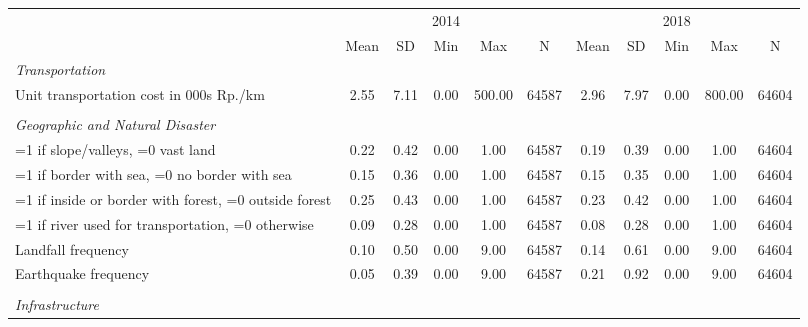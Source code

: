 \begin{tabular}{l*{2}{ccccc}}
\toprule
                &         &         &     2014&         &         &     &         &         2018&         &         \\
                &     Mean&       SD&      Min&      Max&        N&     Mean&       SD&      Min&      Max&        N\\
\midrule
\emph{Transportation}&         &         &         &         &         &         &         &         &         &         \\
\hspace{0.25cm}Unit transportation cost in 000s Rp./km&     2.55&     7.11&     0.00&   500.00&    64587&     2.96&     7.97&     0.00&   800.00&    64604\\
\vspace{0.1em} \\ \emph{Geographic and Natural Disaster}&         &         &         &         &         &         &         &         &         &         \\
\hspace{0.25cm}=1 if slope/valleys, =0 vast land&     0.22&     0.42&     0.00&     1.00&    64587&     0.19&     0.39&     0.00&     1.00&    64604\\
\hspace{0.25cm}=1 if border with sea, =0 no border with sea&     0.15&     0.36&     0.00&     1.00&    64587&     0.15&     0.35&     0.00&     1.00&    64604\\
\hspace{0.25cm}=1 if inside or border with forest, =0 outside forest&     0.25&     0.43&     0.00&     1.00&    64587&     0.23&     0.42&     0.00&     1.00&    64604\\
\hspace{0.25cm}=1 if river used for transportation, =0 otherwise&     0.09&     0.28&     0.00&     1.00&    64587&     0.08&     0.28&     0.00&     1.00&    64604\\
\hspace{0.25cm}Landfall frequency &     0.10&     0.50&     0.00&     9.00&    64587&     0.14&     0.61&     0.00&     9.00&    64604\\
\hspace{0.25cm}Earthquake frequency &     0.05&     0.39&     0.00&     9.00&    64587&     0.21&     0.92&     0.00&     9.00&    64604\\
\vspace{0.1em} \\ \emph{Infrastructure}&         &         &         &         &         &         &         &         &         &         \\

\end{tabular}
